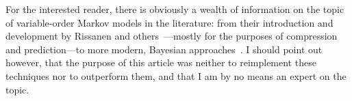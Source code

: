 \documentclass[11pt,a4paper]{article}
\begin{document}
For the interested reader, there is obviously a wealth of information on the
topic of variable-order Markov models in the literature: from their introduction
and development by Rissanen and
others~\cite{rissanen1986complexity,willems1995context,cleary1984data,
begleiter2004prediction}---mostly for the purposes of compression and
prediction---to more modern, Bayesian
approaches~\cite{dimitrakakis2010bayesian,mochihashi2008infinite}. I should
point out however, that the purpose of this article was neither to reimplement
these techniques nor to outperform them, and that I am by no means an expert on
the topic.

\printbibliography
\end{document}
